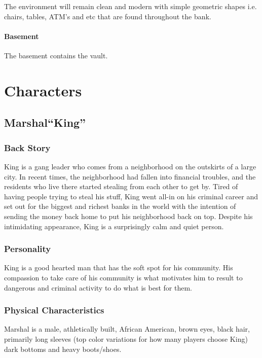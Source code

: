 \documentclass[14pt]{report}
\begin{document}
The environment will remain clean and modern with simple geometric shapes i.e. chairs, tables, ATM’s and etc that are found throughout the bank.

\subsubsection{Basement}
The basement contains the vault.

\chapter{Characters}

\section{Marshal``King''}

\subsection{Back Story}

King is a gang leader who comes from a neighborhood on the outskirts of a large city. In recent times, the neighborhood had fallen into financial troubles, and the residents who live there started stealing from each other to get by. Tired of having people trying to steal his stuff, King went all-in on his criminal career and set out for the biggest and richest banks in the world with the intention of sending the money back home to put his neighborhood back on top. Despite his intimidating appearance, King is a surprisingly calm and quiet person.

\subsection{Personality}

King is a good hearted man that has the soft spot for his community. His compassion to take care of his community is what motivates him to result to dangerous and criminal activity to do what is best for them.

\subsection{Physical Characteristics}

Marshal is a male, athletically built, African American, brown eyes, black hair, primarily long sleeves (top color variations for how many players choose King) dark bottoms and heavy boots/shoes.
\end{document}
